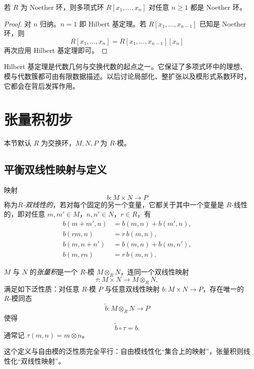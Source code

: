 \begin{corollary}
若 $R$ 为 Noether 环，则多项式环 $R[x_1,\dots,x_n]$ 对任意 $n\ge 1$ 都是 Noether 环。
\end{corollary}

\begin{proof}
对 $n$ 归纳。$n=1$ 即 Hilbert 基定理。若 $R[x_1,\dots,x_{n-1}]$ 已知是 Noether 环，则
\[
R[x_1,\dots,x_n]=R[x_1,\dots,x_{n-1}][x_n]
\]
再次应用 Hilbert 基定理即可。
\end{proof}

\begin{remark}
Hilbert 基定理是代数几何与交换代数的起点之一。它保证了多项式环中的理想、模与代数簇都可由有限数据描述。以后讨论局部化、整扩张以及模形式系数环时，它都会在背后发挥作用。
\end{remark}

\section{张量积初步}

本节默认 $R$ 为交换环，$M,N,P$ 为 $R$-模。

\subsection{平衡双线性映射与定义}

\begin{definition}
映射
\[
b\colon M\times N\to P
\]
称为\emph{$R$-双线性的}，若对每个固定的另一个变量，它都关于其中一个变量是 $R$-线性的，即对任意 $m,m'\in M$，$n,n'\in N$，$r\in R$，有
\begin{align*}
b(m+m',n)&=b(m,n)+b(m',n),\\
b(rm,n)&=r\,b(m,n),\\
b(m,n+n')&=b(m,n)+b(m,n'),\\
b(m,rn)&=r\,b(m,n).
\end{align*}
\end{definition}

\begin{definition}
$M$ 与 $N$ 的\emph{张量积}是一个 $R$-模 $M\otimes_R N$，连同一个双线性映射
\[
\tau\colon M\times N\to M\otimes_R N,
\]
满足如下泛性质：对任意 $R$-模 $P$ 与任意双线性映射 $b\colon M\times N\to P$，存在唯一的 $R$-模同态
\[
\widetilde b\colon M\otimes_R N\to P
\]
使得
\[
\widetilde b\circ \tau=b.
\]
通常记 $\tau(m,n)=m\otimes n$。
\end{definition}

这个定义与自由模的泛性质完全平行：自由模线性化“集合上的映射”，张量积则线性化“双线性映射”。

